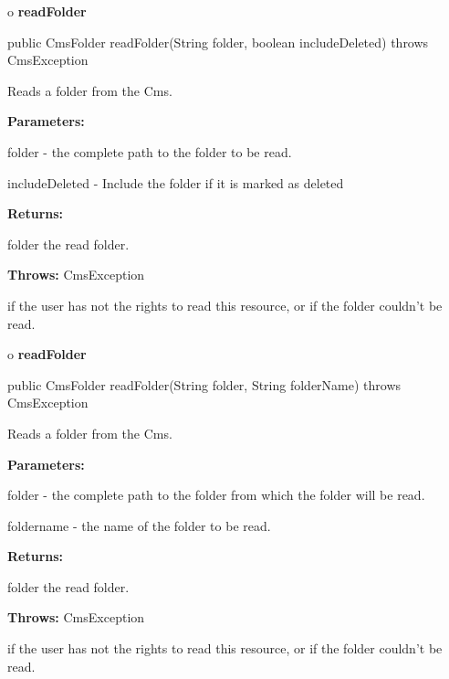 o {\bf readFolder}

\begin{PRE}
 public CmsFolder readFolder(String folder,
                             boolean includeDeleted) throws CmsException
\end{PRE}

\begin{description}
\htmlDD Reads a folder from the Cms.

\begin{description}
\item {\bf Parameters:}

folder - the complete path to the folder to be read.

includeDeleted - Include the folder if it is marked as deleted
\item {\bf Returns:}

folder the read folder.
\item {\bf Throws:} CmsException

if the user has not the rights to read this resource, or if the folder
couldn't be read.
\end{description}

\end{description}

o {\bf readFolder}

\begin{PRE}
 public CmsFolder readFolder(String folder,
                             String folderName) throws CmsException
\end{PRE}

\begin{description}
\htmlDD Reads a folder from the Cms.

\begin{description}
\item {\bf Parameters:}

folder - the complete path to the folder from which the folder will be read.

foldername - the name of the folder to be read.
\item {\bf Returns:}

folder the read folder.
\item {\bf Throws:} CmsException

if the user has not the rights to read this resource, or if the folder
couldn't be read.
\end{description}

\end{description}

